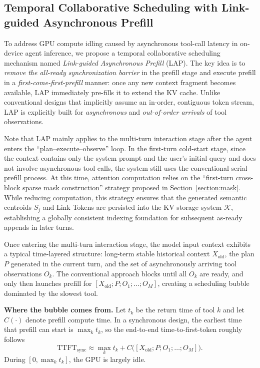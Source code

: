 \subsection{Temporal Collaborative Scheduling with Link-guided Asynchronous Prefill}
To address GPU compute idling caused by asynchronous tool-call latency in on-device agent inference, we propose a temporal collaborative scheduling mechanism named \emph{Link-guided Asynchronous Prefill} (LAP).
The key idea is to \emph{remove the all-ready synchronization barrier} in the prefill stage and execute prefill in a \emph{first-come-first-prefill} manner: once any new context fragment becomes available, LAP immediately pre-fills it to extend the KV cache.
Unlike conventional designs that implicitly assume an in-order, contiguous token stream, LAP is explicitly built for \emph{asynchronous} and \emph{out-of-order arrivals} of tool observations.

Note that LAP mainly applies to the multi-turn interaction stage after the agent enters the ``plan--execute--observe'' loop.
In the first-turn cold-start stage, since the context contains only the system prompt and the user's initial query and does not involve asynchronous tool calls, the system still uses the conventional serial prefill process.
At this time, attention computation relies on the ``first-turn cross-block sparse mask construction'' strategy proposed in Section~\ref{section:mask}.
While reducing computation, this strategy ensures that the generated semantic centroids $S_j$ and Link Tokens are persisted into the KV storage system $\mathcal{K}$, establishing a globally consistent indexing foundation for subsequent as-ready appends in later turns.

Once entering the multi-turn interaction stage, the model input context exhibits a typical time-layered structure:
long-term stable historical context $X_{\text{old}}$, the plan $P$ generated in the current turn, and the set of asynchronously arriving tool observations ${O_k}$.
The conventional approach blocks until all $O_k$ are ready, and only then launches prefill for $[X_{\text{old}}; P; O_1;\ldots;O_M]$, creating a scheduling bubble dominated by the slowest tool.

\textbf{Where the bubble comes from.}
Let $t_k$ be the return time of tool $k$ and let $C(\cdot)$ denote prefill compute time.
In a synchronous design, the earliest time that prefill can start is $\max_k t_k$, so the end-to-end time-to-first-token roughly follows
$$\text{TTFT}_{\text{sync}} \approx \max_k t_k + C\big([X_{\text{old}}; P; O_1;\ldots;O_M]\big).$$
During $[0, \max_k t_k]$, the GPU is largely idle.


